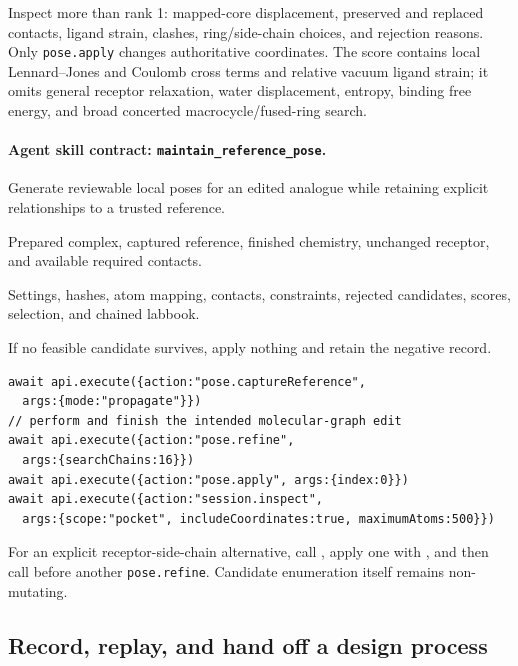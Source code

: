 \begin{small}
Inspect more than rank 1: mapped-core displacement, preserved and replaced contacts, ligand strain, clashes, ring/side-chain choices, and rejection reasons. Only \texttt{pose.apply} changes authoritative coordinates. The score contains local Lennard--Jones and Coulomb cross terms and relative vacuum ligand strain; it omits general receptor relaxation, water displacement, entropy, binding free energy, and broad concerted macrocycle/fused-ring search.

\paragraph{Agent skill contract: \texttt{maintain\_reference\_pose}.}

\begin{description}[leftmargin=2.2cm,style=nextline]
\item[Goal] Generate reviewable local poses for an edited analogue while retaining explicit relationships to a trusted reference.
\item[Preconditions] Prepared complex, captured reference, finished chemistry, unchanged receptor, and available required contacts.
\item[Evidence] Settings, hashes, atom mapping, contacts, constraints, rejected candidates, scores, selection, and chained labbook.
\item[Stop] If no feasible candidate survives, apply nothing and retain the negative record.
\end{description}

\begin{lstlisting}
await api.execute({action:"pose.captureReference",
  args:{mode:"propagate"}})
// perform and finish the intended molecular-graph edit
await api.execute({action:"pose.refine",
  args:{searchChains:16}})
await api.execute({action:"pose.apply", args:{index:0}})
await api.execute({action:"session.inspect",
  args:{scope:"pocket", includeCoordinates:true, maximumAtoms:500}})
\end{lstlisting}

For an explicit receptor-side-chain alternative, call , apply one with , and then call  before another \texttt{pose.refine}. Candidate enumeration itself remains non-mutating.

\subsection{Record, replay, and hand off a design process}\label{appB:history}


\end{small}
